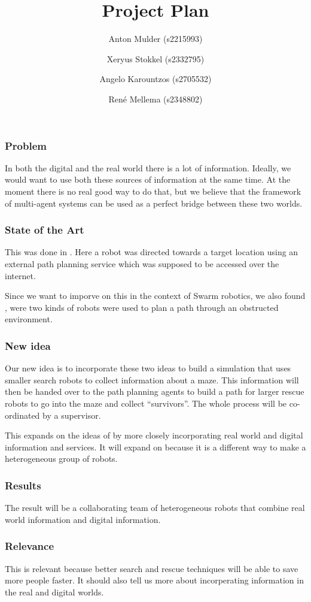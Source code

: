 \documentclass[a4paper,10pt]{article}
\title{Project Plan}
\author{Anton Mulder (s2215993) \and Xeryus Stokkel (s2332795) \and Angelo
    Karountzos (s2705532) \and Ren\'e Mellema (s2348802)}
\date{}
\begin{document}
\maketitle

\subsubsection*{Problem}
In both the digital and the real world there is a lot of information.
Ideally, we would want to use both these sources of information at the same
time. At the moment there is no real good way to do that, but we believe
that the framework of multi-agent systems can be used as a perfect bridge
between these two worlds. 

\subsubsection*{State of the Art}
This was done in \citet{intframe}. Here a robot was directed towards
a target location using an external path planning service which was
supposed to be accessed over the internet. 

Since we want to imporve on this in the context of Swarm robotics, we also
found \citet{selforg}, were two kinds of robots were used to plan a path
through an obstructed environment. 

\subsubsection*{New idea}
Our new idea is to incorporate these two ideas to build a simulation that uses
smaller search robots to collect information about a maze. This information will
then be handed over to the path planning agents to build a path for larger
rescue robots to go into the maze and collect ``survivors''. The whole
process will be co-ordinated by a supervisor. 

This expands on the ideas of
\citet{intframe} by more closely incorporating real world and digital
information and services. It will expand on \citet{selforg} because it is a
different way to make a heterogeneous group of robots.

\subsubsection*{Results}
The result will be a collaborating team of heterogeneous robots that
combine real world information and digital information. 

\subsubsection*{Relevance}
This is relevant because better search and rescue techniques will be able
to save more people faster. It should also tell us more about incorperating
information in the real and digital worlds. 



\end{document}
